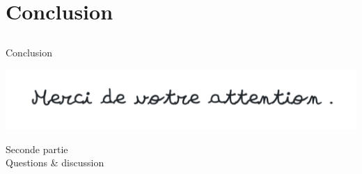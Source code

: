 \documentclass[11pt,english,ignorenonframetext,]{beamer}
\newcommand{\Fontify}{}
\providecommand{\tightlist}{%
  \setlength{\itemsep}{0pt}\setlength{\parskip}{0pt}}
\begin{document}










\section{\hfill{}Conclusion\hfill{}}
\subsection{}


\begin{frame}{Conclusion}

\begin{center}
  \includegraphics[width=0.80\linewidth,right]{figures/merci_ecriture_manuelle.png}
\end{center}

\begin{center}
  \begin{Large}
    Seconde partie\\
    Questions \& discussion
  \end{Large}
\end{center}

\end{frame}
\end{document}
